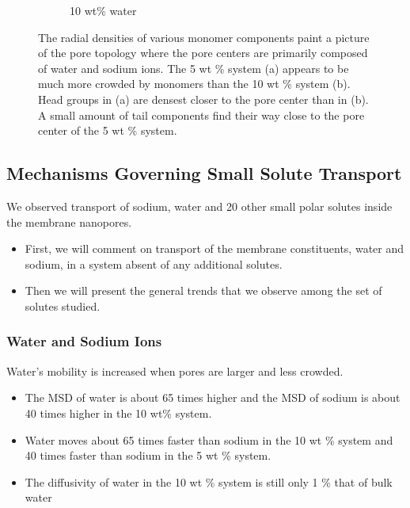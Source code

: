 \documentclass{article}
\begin{document}
\begin{figure}[!htb]
\begin{subfigure}{0.45\textwidth}
  \caption{10 wt\% water}\label{fig:component_density_10wt}
  \end{subfigure}
  \caption{The radial densities of various monomer components paint a picture of the
  pore topology where the pore centers are primarily composed of water and sodium ions.
  The 5 wt \% system (a) appears to be much more crowded by monomers than the 
  10 wt \% system (b). Head groups in (a) are densest closer to the pore center than
  in (b). A small amount of tail components find their way close to the pore center 
  of the 5 wt \% system. }\label{fig:component_densities}
  \end{figure}

  \subsection*{Mechanisms Governing Small Solute Transport}\label{section:mechanism_overview}

  We observed transport of sodium, water and 20 other small polar solutes inside the
  membrane nanopores. 
  \begin{itemize}
  	\item First, we will comment on transport of the membrane constituents, water and sodium,
  	in a system absent of any additional solutes.
    \item Then we will present the general trends that we observe among the set of 
    solutes studied.
  \end{itemize}
  
  \subsubsection*{Water and Sodium Ions}\label{section:transport_water_sodium}

  \noindent Water's mobility is increased when pores are larger and less crowded.
  \begin{itemize}
    \item The MSD of water is about 65 times higher and the MSD of sodium is about 40
    times higher in the 10 wt\% system.
    \item Water moves about 65 times faster than sodium in the 10 wt \% system and
    40 times faster than sodium in the 5 wt \% system. %
    \item The diffusivity of water in the 10 wt \% system is still only 1 \% that of 
    bulk water %
  \end{itemize}
  
\end{document}
